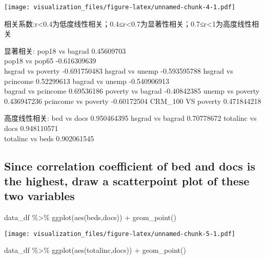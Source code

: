 \documentclass[
]{article}
\newenvironment{Shaded}{\begin{snugshade}}{\end{snugshade}}
\newcommand{\FunctionTok}[1]{\textcolor[rgb]{0.00,0.00,0.00}{#1}}
\newcommand{\NormalTok}[1]{#1}
\newcommand{\SpecialCharTok}[1]{\textcolor[rgb]{0.00,0.00,0.00}{#1}}
\begin{document}
\texttt{[image: visualization\_files/figure-latex/unnamed-chunk-4-1.pdf]}

相关系数:\textbar r\textbar\textless0.4为低度线性相关；0.4≤\textbar r\textbar\textless0.7为显著性相关；0.7≤\textbar r\textbar\textless1为高度线性相关

显著相关: pop18 vs bagrad 0.45609703\\
pop18 vs pop65 -0.616309639\\
hsgrad vs poverty -0.691750483 hsgrad vs unemp -0.593595788 hsgrad vs
pcincome 0.52299613 bagrad vs unemp -0.540906913\\
bagrad vs pcincome 0.69536186 poverty vs bagrad -0.40842385 unemp vs
poverty 0.436947236 pcincome vs poverty -0.60172504 CRM\_100 VS poverty
0.471844218

高度线性相关: bed vs docs 0.950464395 hsgrad vs bagrad 0.70778672
totalinc vs docs 0.948110571\\
totalinc vs beds 0.902061545

\hypertarget{since-correlation-coefficient-of-bed-and-docs-is-the-highest-draw-a-scatterpoint-plot-of-these-two-variables}{%
\subsection{Since correlation coefficient of bed and docs is the
highest, draw a scatterpoint plot of these two
variables}\label{since-correlation-coefficient-of-bed-and-docs-is-the-highest-draw-a-scatterpoint-plot-of-these-two-variables}}

\begin{Shaded}
\begin{Highlighting}[]
\NormalTok{data\_df }\SpecialCharTok{\%\textgreater{}\%} 
  \FunctionTok{ggplot}\NormalTok{(}\FunctionTok{aes}\NormalTok{(beds,docs)) }\SpecialCharTok{+} \FunctionTok{geom\_point}\NormalTok{()}
\end{Highlighting}
\end{Shaded}

\texttt{[image: visualization\_files/figure-latex/unnamed-chunk-5-1.pdf]}

\begin{Shaded}
\begin{Highlighting}[]
\NormalTok{data\_df }\SpecialCharTok{\%\textgreater{}\%} 
  \FunctionTok{ggplot}\NormalTok{(}\FunctionTok{aes}\NormalTok{(totalinc,docs)) }\SpecialCharTok{+} \FunctionTok{geom\_point}\NormalTok{()}
\end{Highlighting}
\end{Shaded}
\end{document}

